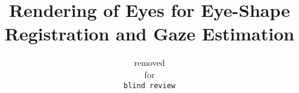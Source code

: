 \documentclass[10pt,twocolumn,letterpaper]{article}
\begin{document}
\title{Rendering of Eyes for Eye-Shape Registration and Gaze Estimation}



\author{removed\\
for\\
{\tt\small blind review}
}

\maketitle

\begin{abstract}

\end{abstract}









\clearpage

{\small


}
\end{document}
